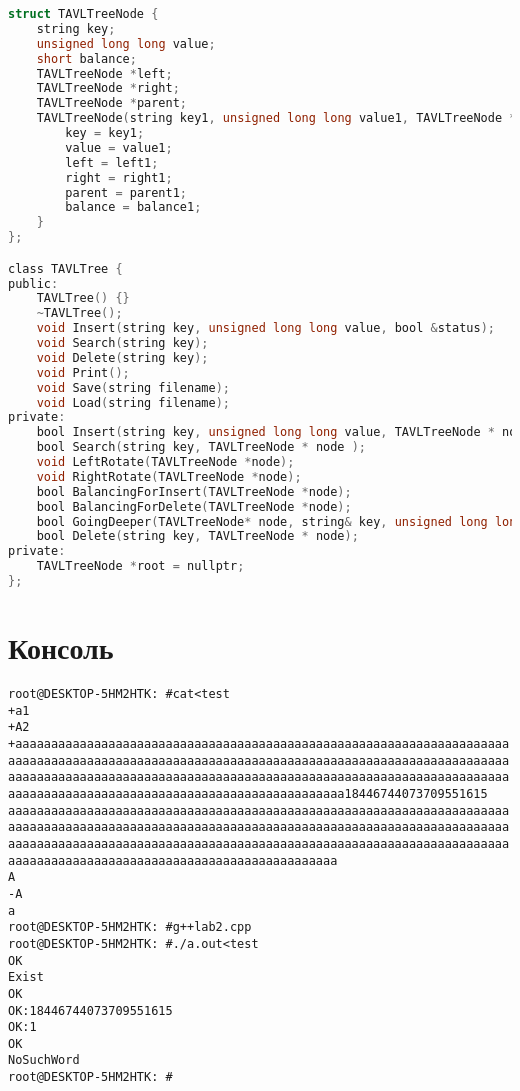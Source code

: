 \begin{lstlisting}[language=C]
struct TAVLTreeNode {
    string key;
    unsigned long long value;
    short balance;
    TAVLTreeNode *left;
    TAVLTreeNode *right;
    TAVLTreeNode *parent;
    TAVLTreeNode(string key1, unsigned long long value1, TAVLTreeNode *left1, TAVLTreeNode *right1, TAVLTreeNode *parent1, short balance1) {
        key = key1;
        value = value1;
        left = left1;
        right = right1;
        parent = parent1;
        balance = balance1;
    }
};

class TAVLTree {
public:
    TAVLTree() {}
    ~TAVLTree();
    void Insert(string key, unsigned long long value, bool &status);
    void Search(string key);
    void Delete(string key);
    void Print();
    void Save(string filename);
    void Load(string filename);
private:
    bool Insert(string key, unsigned long long value, TAVLTreeNode * node, bool &status);
    bool Search(string key, TAVLTreeNode * node );
    void LeftRotate(TAVLTreeNode *node);
    void RightRotate(TAVLTreeNode *node);
    bool BalancingForInsert(TAVLTreeNode *node);
    bool BalancingForDelete(TAVLTreeNode *node);
    bool GoingDeeper(TAVLTreeNode* node, string& key, unsigned long long& value);
    bool Delete(string key, TAVLTreeNode * node);
private:
    TAVLTreeNode *root = nullptr;
};
\end{lstlisting}


\section{Консоль}
\begin{alltt}
root@DESKTOP-5HM2HTK:~# cat <test
+ a 1
+ A 2
+ aaaaaaaaaaaaaaaaaaaaaaaaaaaaaaaaaaaaaaaaaaaaaaaaaaaaaaaaaaaaaaaaaaaaaaaaaaaaaaaaaaaaaaaaaaaaaaaaaaaaaaaaaaaaaaaaaaaaaaaaaaaaaaaaaaaaaaaaaaaaaaaaaaaaaaaaaaaaaaaaaaaaaaaaaaaaaaaaaaaaaaaaaaaaaaaaaaaaaaaaaaaaaaaaaaaaaaaaaaaaaaaaaaaaaaaaaaaaaaaaaaaaaaaaaaaaaaaa 18446744073709551615
aaaaaaaaaaaaaaaaaaaaaaaaaaaaaaaaaaaaaaaaaaaaaaaaaaaaaaaaaaaaaaaaaaaaaaaaaaaaaaaaaaaaaaaaaaaaaaaaaaaaaaaaaaaaaaaaaaaaaaaaaaaaaaaaaaaaaaaaaaaaaaaaaaaaaaaaaaaaaaaaaaaaaaaaaaaaaaaaaaaaaaaaaaaaaaaaaaaaaaaaaaaaaaaaaaaaaaaaaaaaaaaaaaaaaaaaaaaaaaaaaaaaaaaaaaaaaaaa
A
- A
a
root@DESKTOP-5HM2HTK:~# g++ lab2.cpp
root@DESKTOP-5HM2HTK:~# ./a.out <test
OK
Exist
OK
OK: 18446744073709551615
OK: 1
OK
NoSuchWord
root@DESKTOP-5HM2HTK:~#
\end{alltt}
\pagebreak

